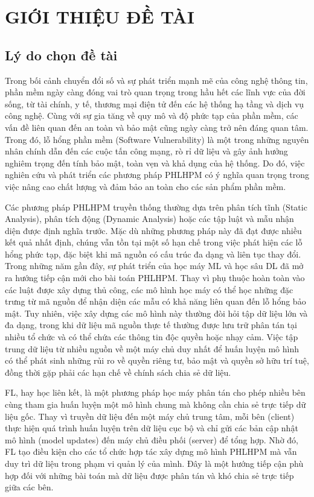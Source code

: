 \chapter{GIỚI THIỆU ĐỀ TÀI}

\section{Lý do chọn đề tài}

Trong bối cảnh chuyển đổi số và sự phát triển mạnh mẽ của công nghệ thông tin, phần mềm ngày càng
đóng vai trò quan trọng trong hầu hết các lĩnh vực của đời sống, từ tài chính, y tế, thương mại
điện tử đến các hệ thống hạ tầng và dịch vụ công nghệ. Cùng với sự gia tăng về quy mô và độ phức
tạp của phần mềm, các vấn đề liên quan đến an toàn và bảo mật cũng ngày càng trở nên đáng quan tâm.
Trong đó, lỗ hổng phần mềm (Software Vulnerability) là một trong những nguyên nhân chính dẫn đến
các cuộc tấn công mạng, rò rỉ dữ liệu và gây ảnh hưởng nghiêm trọng đến tính bảo mật, toàn vẹn và
khả dụng của hệ thống. Do đó, việc nghiên cứu và phát triển các phương pháp \ac{PHLHPM} có ý nghĩa
quan trọng trong việc nâng cao chất lượng và đảm bảo an toàn cho các sản phẩm phần mềm.

Các phương pháp \ac{PHLHPM} truyền thống thường dựa trên phân tích tĩnh (Static Analysis), phân
tích động (Dynamic Analysis) hoặc các tập luật và mẫu nhận diện được định nghĩa trước. Mặc dù những
phương pháp này đã đạt được nhiều kết quả nhất định, chúng vẫn tồn tại một số hạn chế trong việc
phát hiện các lỗ hổng phức tạp, đặc biệt khi mã nguồn có cấu trúc đa dạng và liên tục thay đổi.
Trong những năm gần đây, sự phát triển của học máy \ac{ML} và học sâu \ac{DL} đã mở ra hướng tiếp
cận mới cho bài toán \ac{PHLHPM}. Thay vì phụ thuộc hoàn toàn vào các luật được xây dựng thủ công,
các mô hình học máy có thể học những đặc trưng từ mã nguồn để nhận diện các mẫu có khả năng liên
quan đến lỗ hổng bảo mật. Tuy nhiên, việc xây dựng các mô hình này thường đòi hỏi tập dữ liệu lớn
và đa dạng, trong khi dữ liệu mã nguồn thực tế thường được lưu trữ phân tán tại nhiều tổ chức và có
thể chứa các thông tin độc quyền hoặc nhạy cảm. Việc tập trung dữ liệu từ nhiều nguồn về một máy
chủ duy nhất để huấn luyện mô hình có thể phát sinh những rủi ro về quyền riêng tư, bảo mật và
quyền sở hữu trí tuệ, đồng thời gặp phải các hạn chế về chính sách chia sẻ dữ liệu.

\ac{FL}, hay học liên kết, là một phương pháp học máy phân tán cho phép nhiều bên cùng tham gia huấn luyện một mô hình chung mà không cần chia sẻ trực tiếp dữ liệu gốc. Thay vì
truyền dữ liệu đến một máy chủ trung tâm, mỗi bên (client) thực hiện quá trình huấn luyện trên dữ
liệu cục bộ và chỉ gửi các bản cập nhật mô hình (model updates) đến máy chủ điều phối (server) để
tổng hợp. Nhờ đó, \ac{FL} tạo điều kiện cho các tổ chức hợp tác xây dựng mô hình \ac{PHLHPM} mà vẫn duy trì dữ liệu trong phạm vi quản lý của mình. Đây là một hướng tiếp
cận phù hợp đối với những bài toán mà dữ liệu được phân tán và khó chia sẻ trực tiếp giữa các bên.

